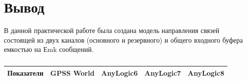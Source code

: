 \clearpage

\section*{\LARGE Вывод}
В данной практической работе была создана модель направления связей
состоящей из двух каналов (основного и резервного) и общего входного
буфера емкостью на Еmk сообщений.

\begin{longtable} {
	|p{}
	|p{}
	|p{}
	|p{}
	|p{}
	|}
	\caption{}\\
	\hline Показатели & GPSS World & AnyLogic6
		& AnyLogic7 & AnyLogic8 \\ \hline
	\endhead


\end{longtable}

